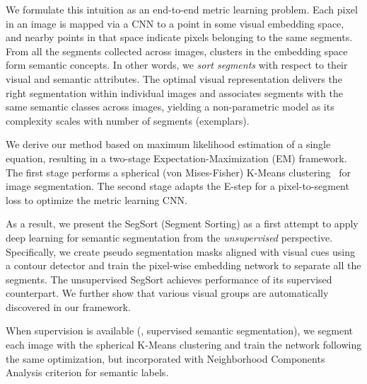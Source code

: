 \documentclass[10pt,twocolumn,letterpaper]{article}
\begin{document}
We formulate this intuition as an end-to-end metric learning problem.
Each pixel in an image is mapped via a CNN to a point in some visual embedding space, and nearby points in that space indicate pixels belonging to the same segments.
From all the segments collected across images, clusters in the embedding space form semantic concepts.
In other words, we {\it sort segments} with respect to their visual and semantic attributes.
The optimal visual representation delivers the right segmentation within individual images and associates segments with the same semantic classes across images, yielding a non-parametric model as its complexity scales with number of segments (exemplars).















We derive our method based on maximum likelihood estimation of a single equation, resulting in a two-stage Expectation-Maximization (EM) framework. The first stage performs a spherical (von Mises-Fisher) K-Means clustering~\cite{banerjee2005clustering} for image segmentation. The second stage adapts the E-step for a pixel-to-segment loss to optimize the metric learning CNN.




As a result, we present the SegSort (Segment Sorting) as a first attempt to apply deep learning for semantic segmentation from the {\it unsupervised} perspective. Specifically, we create pseudo segmentation masks aligned with visual cues using a contour detector \cite{arbelaez2011contour,hwang2015pixel,xie2015holistically} and train the pixel-wise embedding network to separate all the segments. The unsupervised SegSort achieves  performance of its supervised counterpart. We further show that various visual groups are automatically discovered in our framework.

When supervision is available (\ie, supervised semantic segmentation), we segment each image with the spherical K-Means clustering and train the network following the same optimization, but incorporated with Neighborhood Components Analysis criterion \cite{goldberger2005neighbourhood,wu2018improving} for semantic labels.
\end{document}
